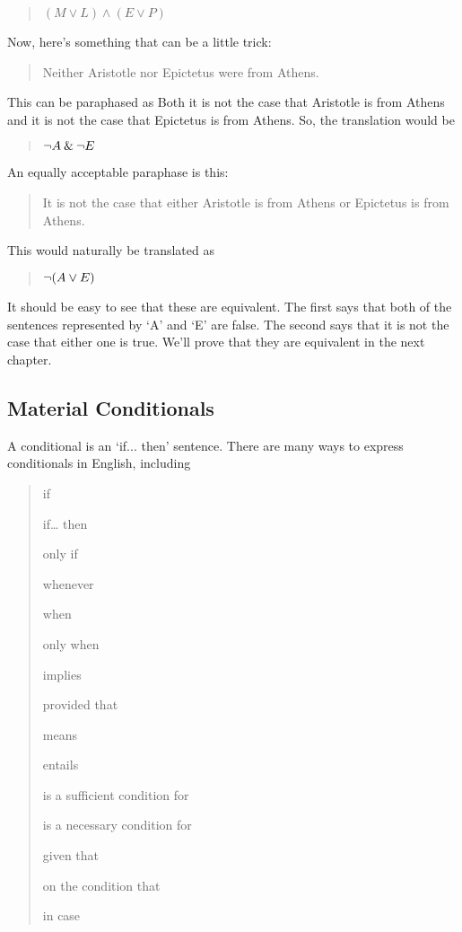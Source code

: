 \documentclass[../logic-text.tex]{subfiles}
\begin{document}
\begin{quote}
  \((M \lor L) \land (E \lor P)\)
\end{quote}


Now, here's something that can be a little trick:

\begin{quote}
  Neither Aristotle nor Epictetus were from Athens.
\end{quote}

\noindent This can be paraphased as Both it is not the case that Aristotle is from Athens and it is not the case that Epictetus is from Athens. So, the translation would be

\begin{quote}
 \(\neg A \mathbin{\&} \neg E\)
\end{quote}


An equally acceptable paraphase is this:

\begin{quote}
  It is not the case that either Aristotle is from Athens or Epictetus is from Athens.
\end{quote}


\noindent This would naturally be translated as

\begin{quote}
  \(\neg (A \lor E)\)
\end{quote}

\noindent It should be easy to see that these are equivalent. The first says that both of the sentences represented by \enquote*{A} and \enquote*{E} are false. The second says that it is not the case that either one is true. We'll prove that they are equivalent in the next chapter.


\subsection{Material Conditionals}
\label{sec:mater-cond}


A conditional is an \enquote*{if... then} sentence. There are many ways to express conditionals in English, including

\begin{quote}


  if

  if\ldots{} then

  only if

  whenever

  when

  only when

  implies

  provided that

  means

  entails

  is a sufficient condition for

  is a necessary condition for

  given that

  on the condition that

  in case
\end{quote}
\end{document}
